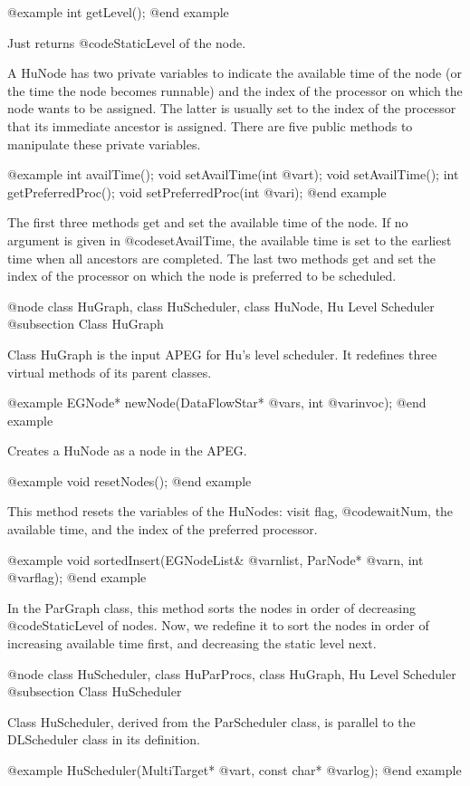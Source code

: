 @example
int getLevel();
@end example

Just returns @code{StaticLevel} of the node.

A HuNode has two private variables to indicate the available time of the node
(or the time the node becomes runnable)
and the index of the processor on which the node wants to be assigned. 
The latter is usually set to the index of the processor that its immediate
ancestor is assigned. There are five public methods to manipulate these
private variables.

@example
int availTime();
void setAvailTime(int @var{t});
void setAvailTime();
int getPreferredProc();
void setPreferredProc(int @var{i});
@end example

The first three methods get and set the available time of the node. If no
argument is given in @code{setAvailTime}, the available time is set to
the earliest time when all ancestors are completed. The last two methods
get and set the index of the processor on which
the node is preferred to be scheduled.

@node class HuGraph, class HuScheduler, class HuNode, Hu Level Scheduler
@subsection Class HuGraph

Class HuGraph is the input APEG for Hu's level scheduler. It redefines
three virtual methods of its parent classes.

@example
EGNode* newNode(DataFlowStar* @var{s}, int @var{invoc});
@end example

Creates a HuNode as a node in the APEG.

@example
void resetNodes();
@end example

This method resets the variables of the HuNodes: visit flag, @code{waitNum},
the available time, and the index of the preferred processor.

@example
void sortedInsert(EGNodeList& @var{nlist}, ParNode* @var{n}, int @var{flag});
@end example

In the ParGraph class, this method sorts the nodes in order of decreasing
@code{StaticLevel} of nodes. Now, we redefine it to sort the nodes in order
of increasing available time first, and decreasing the static level next.

@node class HuScheduler, class HuParProcs, class HuGraph, Hu Level Scheduler
@subsection Class HuScheduler

Class HuScheduler, derived from the ParScheduler class, is parallel to the
DLScheduler class in its definition.

@example
HuScheduler(MultiTarget* @var{t}, const char* @var{log});
@end example

